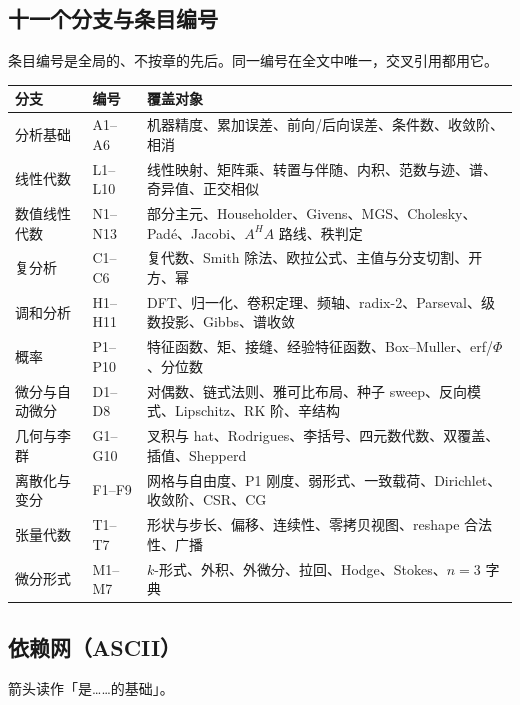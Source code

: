 \subsection{十一个分支与条目编号}

条目编号是全局的、不按章的先后。同一编号在全文中唯一，交叉引用都用它。

\begin{center}
\begin{tabular}{L{2.5cm}L{2.9cm}L{8.4cm}}
\toprule
分支 & 编号 & 覆盖对象 \\
\midrule
分析基础 & A1--A6 & 机器精度、累加误差、前向/后向误差、条件数、收敛阶、相消 \\
线性代数 & L1--L10 & 线性映射、矩阵乘、转置与伴随、内积、范数与迹、谱、奇异值、正交相似 \\
数值线性代数 & N1--N13 & 部分主元、Householder、Givens、MGS、Cholesky、Padé、Jacobi、$A^{H}A$ 路线、秩判定 \\
复分析 & C1--C6 & 复代数、Smith 除法、欧拉公式、主值与分支切割、开方、幂 \\
调和分析 & H1--H11 & DFT、归一化、卷积定理、频轴、radix-2、Parseval、级数投影、Gibbs、谱收敛 \\
概率 & P1--P10 & 特征函数、矩、接缝、经验特征函数、Box--Muller、erf/$\Phi$、分位数 \\
微分与自动微分 & D1--D8 & 对偶数、链式法则、雅可比布局、种子 sweep、反向模式、Lipschitz、RK 阶、辛结构 \\
几何与李群 & G1--G10 & 叉积与 hat、Rodrigues、李括号、四元数代数、双覆盖、插值、Shepperd \\
离散化与变分 & F1--F9 & 网格与自由度、P1 刚度、弱形式、一致载荷、Dirichlet、收敛阶、CSR、CG \\
张量代数 & T1--T7 & 形状与步长、偏移、连续性、零拷贝视图、reshape 合法性、广播 \\
微分形式 & M1--M7 & $k$-形式、外积、外微分、拉回、Hodge、Stokes、$n=3$ 字典 \\
\bottomrule
\end{tabular}
\end{center}

\subsection{依赖网（ASCII）}

箭头读作「是……的基础」。

